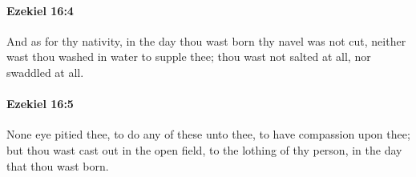 		\paragraph{Ezekiel 16:4} %
			\label{EZEKIEL-16-4}

			And as for thy nativity, in the day thou wast born thy navel was not cut, neither wast thou washed in water to supple thee; thou wast not salted at all, nor swaddled at all.


		\paragraph{Ezekiel 16:5} %
			\label{EZEKIEL-16-5}

			None eye pitied thee, to do any of these unto thee, to have compassion upon thee; but thou wast cast out in the open field, to the lothing of thy person, in the day that thou wast born.


